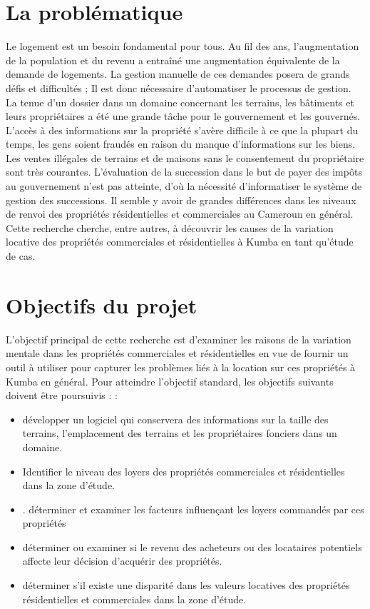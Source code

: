 \documentclass[english,12pt,a4paper]{report}
\begin{document}
\section{La problématique}
Le logement est un besoin fondamental pour tous. Au fil des ans, l'augmentation de la population et du revenu a entraîné une augmentation équivalente de la demande de logements. La gestion manuelle de ces demandes posera de grands défis et difficultés ; Il est donc nécessaire d'automatiser le processus de gestion. La tenue d'un dossier dans un domaine concernant les terrains, les bâtiments et leurs propriétaires a été une grande tâche pour le gouvernement et les gouvernés. L'accès à des informations sur la propriété s'avère difficile à ce que la plupart du temps, les gens soient fraudés en raison du manque d'informations sur les biens. Les ventes illégales de terrains et de maisons sans le consentement du propriétaire sont très courantes. L'évaluation de la succession dans le but de payer des impôts au gouvernement n'est pas atteinte, d'où la nécessité d'informatiser le système de gestion des successions. Il semble y avoir de grandes différences dans les niveaux de renvoi des propriétés résidentielles et commerciales au Cameroun en général. Cette recherche cherche, entre autres, à découvrir les causes de la variation locative des propriétés commerciales et résidentielles à Kumba en tant qu'étude de cas. 

\section{Objectifs du projet }
 L'objectif principal de cette recherche est d'examiner les raisons de la variation mentale dans les propriétés commerciales et résidentielles en vue de fournir un outil à utiliser pour capturer les problèmes liés à la location sur ces propriétés à Kumba en général. 
 Pour atteindre l'objectif standard, les objectifs suivants doivent être poursuivis : :
\begin{itemize}
	\item développer un logiciel qui conservera des informations sur la taille des terrains, l'emplacement des terrains et les propriétaires fonciers dans un domaine.
	\item  Identifier le niveau des loyers des propriétés commerciales et résidentielles dans la zone d'étude.
	\item . déterminer et examiner les facteurs influençant les loyers commandés par ces propriétés 
	\item déterminer ou examiner si le revenu des acheteurs ou des locataires potentiels affecte leur décision d'acquérir des propriétés.
	\item déterminer s'il existe une disparité dans les valeurs locatives des propriétés résidentielles et commerciales dans la zone d'étude.
\end{itemize}
\end{document}
